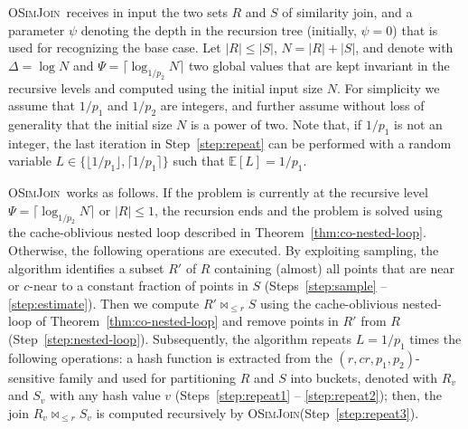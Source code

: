 \documentclass{llncs}
\newcommand{\E}[1]{\mathbb{E}\left[#1\right]}
\newcommand{\SimJoin}{\textsc{OSimJoin}}
\begin{document}
\SimJoin\ receives in input the two sets $R$ and $S$ of similarity join, and a parameter $\psi$ denoting the depth in the recursion tree (initially, $\psi=0$) that is used for recognizing the base case. 
Let  $|R| \leq |S|$, $N=|R|+|S|$, and denote with $\Delta=\log N$ and $\Psi = \lceil \log_{1/p_2} N\rceil$ two global values that are kept invariant in the recursive levels and computed using the initial input size $N$. 
For simplicity we assume that $1/p_1$ and $1/p_2$ are integers, and further assume without loss of generality that the initial size $N$ is a power of two. 
Note that, if $1/p_1$ is not an integer, the last iteration in Step~\ref{step:repeat} can be performed with a random variable $L\in \{\lfloor 1/p_1\rfloor,\lceil 1/p_1\rceil\}$ such that $\E{L}=1/p_1$.

\SimJoin\ works as follows. 
If the problem is currently at the recursive level $\Psi = \lceil \log_{1/p_2} N\rceil$ or $|R|\leq 1$, the recursion ends and  the problem is solved using the cache-oblivious nested loop described in Theorem~\ref{thm:co-nested-loop}. 
Otherwise, the following operations are executed.
By exploiting sampling, the algorithm identifies a subset $R'$ of $R$ containing (almost) all points that are near or $c$-near to a constant fraction of points in $S$ (Steps~\ref{step:sample} -- \ref{step:estimate}).
Then we compute $R' \bowtie_{\leq r} S$ using the cache-oblivious nested-loop of Theorem~\ref{thm:co-nested-loop} and remove points in $R'$ from $R$ (Step~\ref{step:nested-loop}).
Subsequently, the algorithm repeats $L=1/p_1$ times the following operations: a hash function is extracted from the $(r,cr, p_1, p_2)$-sensitive family and used for partitioning $R$ and $S$ into buckets, denoted with $R_v$ and $S_v$ with any hash value $v$ (Steps~\ref{step:repeat1} -- \ref{step:repeat2});
then, the join $R_v \bowtie_{\leq r} S_v$ is computed recursively by \SimJoin (Step~\ref{step:repeat3}).
\end{document}
